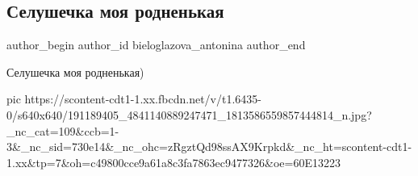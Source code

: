  
 
 
 
 
 
\subsection{Селушечка моя родненькая}
\label{sec:06_06_2021.fb.bieloglazova_antonina.1.selo_foto}
\ifcmt
 author_begin
   author_id bieloglazova_antonina
 author_end
\fi

Селушечка моя родненькая)

\ifcmt
  pic https://scontent-cdt1-1.xx.fbcdn.net/v/t1.6435-0/s640x640/191189405_4841140889247471_1813586559857444814_n.jpg?_nc_cat=109&ccb=1-3&_nc_sid=730e14&_nc_ohc=zRgztQd98ssAX9Krpkd&_nc_ht=scontent-cdt1-1.xx&tp=7&oh=c49800cce9a61a8c3fa7863ec9477326&oe=60E13223
\fi

